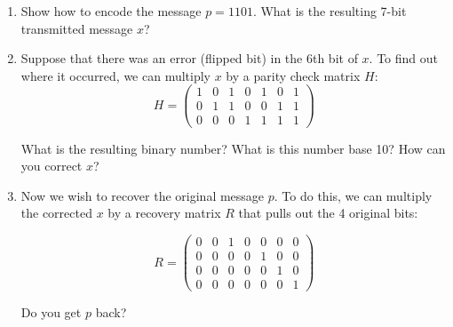 \documentclass[11pt]{article}
\begin{document}
\begin{enumerate}
\begin{enumerate}

\item Show how to encode the message $p=1101$.  What is the resulting 7-bit transmitted message $x$?
\vspace{30mm}
\item Suppose that there was an error (flipped bit) in the 6th bit of $x$. To find out where it occurred, we can multiply $x$ by a parity check matrix $H$:
\[ H = \left( \begin{array}{ccccccc} 1 & 0 & 1 & 0 & 1 & 0 & 1 \\
0 & 1 & 1 & 0 & 0 & 1 & 1 \\
0 & 0 & 0 & 1 & 1 & 1 & 1
\end{array} \right)
\]   

What is the resulting binary number?  What is this number base 10? How can you correct $x$?
\vspace{30mm}

\item Now we wish to recover the original message $p$. To do this, we can multiply the corrected $x$ by a recovery matrix $R$ that pulls out the 4 original bits:

\[ R = \left( \begin{array}{ccccccc} 0 & 0 & 1 & 0 & 0 & 0 & 0 \\
0 & 0 & 0 & 0 & 1 & 0 & 0 \\
0 & 0 & 0 & 0 & 0 & 1 & 0 \\
0 & 0 & 0 & 0 & 0 & 0 & 1
\end{array} \right)
\]   

Do you get $p$ back?
\end{enumerate}
 \end{enumerate}
\end{document}
